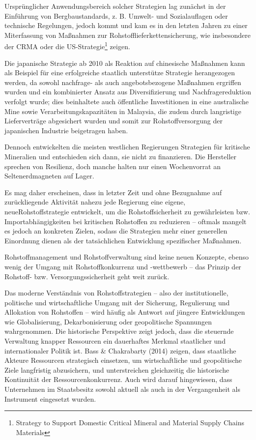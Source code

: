 \documentclass[12pt,a4paper,oneside]{book} %
\begin{document}

Ursprünglicher Anwendungsbereich solcher Strategien lag zunächst in der Einführung von Bergbaustandards, z. B. Umwelt- und Sozialauflagen oder technische Regelungen, jedoch kommt und kam es in den letzten Jahren zu einer Miterfassung von Maßnahmen zur Rohstofflieferkettensicherung, wie insbesondere der CRMA oder die US-Strategie\footnote{Strategy to Support Domestic Critical Mineral and Material Supply Chains Materials} zeigen.

Die japanische Strategie ab 2010 als Reaktion auf chinesische Maßnahmen kann als Beispiel für eine erfolgreiche staatlich unterstütze Strategie herangezogen werden, da sowohl nachfrage- als auch angebotsbezogene Maßnahmen ergriffen wurden und ein kombinierter Ansatz aus Diversifizierung und Nachfragereduktion verfolgt wurde; dies beinhaltete auch öffentliche Investitionen in eine australische Mine sowie Verarbeitungskapazitäten in Malaysia, die zudem durch langristige Lieferverträge abgesichert wurden und somit zur Rohstoffversorgung der japanischen Industrie beigetragen haben.\autocite{IW-Trends_2026-2-6_Neligan_et_al_Rohstoffe, S. 111}


Dennoch entwickelten die meisten westlichen Regierungen Strategien für kritische Mineralien und entschieden sich dann, sie nicht zu finanzieren. Die Hersteller sprechen von Resilienz, doch manche halten nur einen Wochenvorrat an Seltenerdmagneten auf Lager.

Es mag daher erscheinen, dass in letzter Zeit und ohne Bezugnahme auf zurückliegende Aktivität nahezu jede Regierung eine eigene, \glqq neue\grqq Rohstoffstrategie entwickelt, um die Rohstoffsicherheit zu gewährleisten bzw. Importabhängigkeiten bei kritischen Rohstoffen zu reduzieren -- oftmals mangelt es jedoch an konkreten Zielen, sodass die Strategien mehr einer generellen Einordnung dienen als der tatsächlichen Entwicklung spezifischer Maßnahmen.

Rohstoffmanagement und Rohstoffverwaltung sind keine neuen Konzepte, ebenso wenig der Umgang mit Rohstoffkonkurrenz und -wettbewerb -- das Prinzip der Rohstoff- bzw. Versorgungssicherheit geht weit zurück.

Das moderne Verständnis von Rohstoffstrategien --  also der institutionelle, politische und wirtschaftliche Umgang mit der Sicherung, Regulierung und Allokation von Rohstoffen -- wird häufig als Antwort auf jüngere Entwicklungen wie Globalisierung, Dekarbonisierung oder geopolitische Spannungen wahrgenommen. Die historische Perspektive zeigt jedoch, dass die steuernde Verwaltung knapper Ressourcen ein dauerhaftes Merkmal staatlicher und internationaler Politik ist. Bass \& Chakrabarty (2014) zeigen, dass staatliche Akteure Ressourcen strategisch einsetzen, um wirtschaftliche und geopolitische Ziele langfristig abzusichern, und unterstreichen gleichzeitig die historische Kontinuität der Ressourcenkonkurrenz. Auch wird darauf hingewiesen, dass Unternehmen im Staatsbesitz sowohl aktuell als auch in der Vergangenheit als Instrument eingesetzt wurden.
\end{document}
